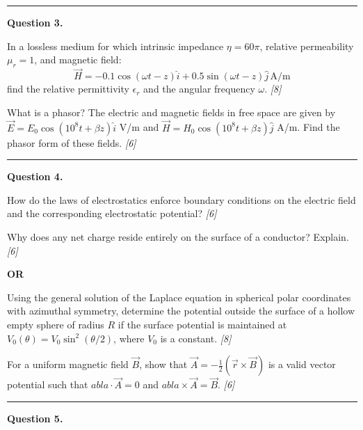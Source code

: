 \documentclass[11pt,a4paper]{article}
\newcommand{\pts}[1]{\hfill   \textit{[#1]}}
\begin{document}
\medskip\rule{\linewidth}{0.2pt}




\noindent   \textbf{Question 3.}

\begin{parts}
  \item In a lossless medium for which intrinsic impedance $\eta = 60\pi$, relative permeability $\mu_r = 1$, and magnetic field:
    \[ \vec{H} = -0.1 \cos(\omega t - z) \hat{i} + 0.5 \sin(\omega t - z) \hat{j} \, \text{A/m} \]
    find the relative permittivity $\epsilon_r$ and the angular frequency $\omega$. \pts{8}
  \item What is a phasor? The electric and magnetic fields in free space are given by $\vec{E} = E_0 \cos(10^8 t + \beta z) \hat{i}$ V/m and $\vec{H} = H_0 \cos(10^8 t + \beta z) \hat{j}$ A/m. Find the phasor form of these fields. \pts{6}
\end{parts}

\medskip\rule{\linewidth}{0.2pt}




\noindent   \textbf{Question 4.}

\begin{parts}
  \item How do the laws of electrostatics enforce boundary conditions on the electric field and the corresponding electrostatic potential? \pts{6}
  \item Why does any net charge reside entirely on the surface of a conductor? Explain. \pts{6}
\end{parts}
\hfill   \textbf{OR}

\begin{parts}
  \item Using the general solution of the Laplace equation in spherical polar coordinates with azimuthal symmetry, determine the potential outside the surface of a hollow empty sphere of radius $R$ if the surface potential is maintained at $V_0( \theta) = V_0 \sin^2( \theta/2)$, where $V_0$ is a constant. \pts{8}
  \item For a uniform magnetic field $\vec{B}$, show that $\vec{A} = -\frac{1}{2} (\vec{r}  \times \vec{B})$ is a valid vector potential such that $
abla \cdot \vec{A} = 0$ and $
abla  \times \vec{A} = \vec{B}$. \pts{6}
\end{parts}

\medskip\rule{\linewidth}{0.2pt}




\noindent   \textbf{Question 5.}
\end{document}

